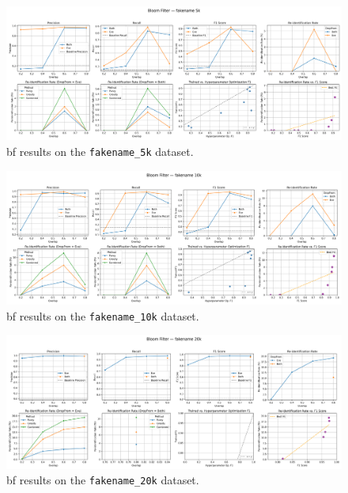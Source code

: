 \begin{figure}[H]
    \centering
    \includegraphics[width=\textwidth]{figures/BloomFilter_fakename_5k_metrics.png}
    \caption{\ac{bf} results on the \texttt{fakename\_5k} dataset.}
    \label{fig:bloomfilter_fakename5k}
\end{figure}

\begin{figure}[H]
    \centering
    \includegraphics[width=\textwidth]{figures/BloomFilter_fakename_10k_metrics.png}
    \caption{\ac{bf} results on the \texttt{fakename\_10k} dataset.}
    \label{fig:bloomfilter_fakename10k}
\end{figure}

\begin{figure}[H]
    \centering
    \includegraphics[width=\textwidth]{figures/BloomFilter_fakename_20k_metrics.png}
    \caption{\ac{bf} results on the \texttt{fakename\_20k} dataset.}
    \label{fig:bloomfilter_fakename20k}
\end{figure}

